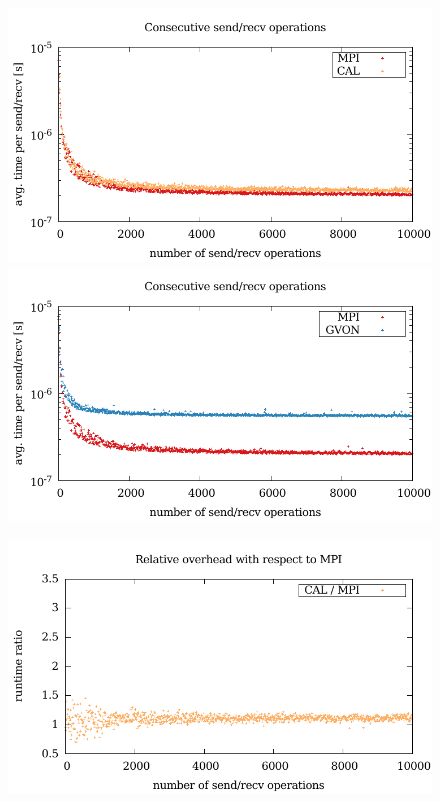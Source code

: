 \begin{figure}[H]
  \begin{minipage}[t]{0.5\textwidth} 
    \includegraphics[width=\textwidth]{plots/50_nsend_cal_kepler}
    \includegraphics[width=\textwidth]{plots/50_nsend_gvon_kepler}
    \end{minipage}%
  \begin{minipage}[t]{0.5\textwidth}
    \includegraphics[width=\textwidth]{plots/50_nsend_overhead_cal}

\end{minipage}
\end{figure}
